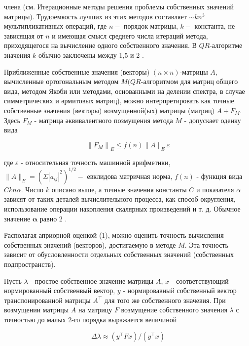 \documentclass[10pt]{article}
\begin{document}
члена (см. Итерационные методы решения проблемы собственных значений матрицы). Трудоемкость лучших из этих методов составляет $\sim k n^{3}$ мультипликативных операций, где $n-$ порядок матрицы, $k-$ константа, не зависящая от $n$ и имеющая смысл среднего числа итераций метода, приходящегося на вычисление одного собственного значения. В $Q R$-алгоритме значения $k$ обычно заключены между 1,5 и 2 .



Приближенные собственные значения (векторы) $(n \times n)$-матрицы $A$, вычисленные ортогональным методом $M(Q R$-алгоритмом для матриц общего вида, методом Якоби или методами, основанными на делении спектра, в случае симметрических и әрмитовых матриц), можно интерпретировать как точные собственные значения (векторы) возмущенной(ых) матрицы (матриц) $A+F_{M}$. Здесь $F_{M}$ - матрица әквивалентного позмущения метода $M$ - допускает оденку вида



\[

\left\|F_{M}\right\|_{E} \leqslant f(n)\|A\|_{E} \varepsilon

\]



где $\varepsilon$ - относительная точность машинной арифметики, $\|A\|_{E}=\left(\Sigma\left|a_{i j}\right|^{2}\right)^{1 / 2}-$ евклидова матричная норма, $f(n)$ - функция вида $C k n \alpha$. Число $k$ описано выше, а точные значения константы $C$ и показателя $\alpha$ зависят от таких деталей вычислительного процесса, как способ округления, использование операции накопления скалярных произведений и т. д. Обычное значение $\boldsymbol{\alpha}$ равно 2 .



Располагая априорной оценкой (1), можно оценить точность вычисления собственных значений (векторов), достигаемую в методе $M$. Эта точность зависит от обусловленности отдельных собственных значений (собственных подпространств).



Пусть $\lambda$ - простое собственное значение матрицы $A$, $x$ - соответствующий нормированный собственвый вектор, $y$ - нормировавный собственный вектор транспонированной матрицы $A^{\top}$ для того же собственного значевия. При возмущении матрицы $A$ на матрицу $F$ возмущение собственного значения $\lambda$ с точностью до малых 2-го порядка выражается величиной



\[

\Delta \lambda \approx\left(y^{\top} F x\right) /\left(y^{\top} x\right)

\]
\end{document}
